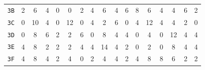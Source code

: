 \documentclass[12pt,a4paper]{article}
\begin{document}
\begin{center}
\begin{small}
\begin{longtable}{c|cccccccccccccccc}
\texttt{3B} & 2 & 6 & 4 & 0 & 0 & 2 & 4 & 6 & 4 & 6 & 8 & 6 & 4 & 4 & 6 & 2 \\
\texttt{3C} & 0 & 10 & 4 & 0 & 12 & 0 & 4 & 2 & 6 & 0 & 4 & 12 & 4 & 4 & 2 & 0 \\
\texttt{3D} & 0 & 8 & 6 & 2 & 2 & 6 & 0 & 8 & 4 & 4 & 0 & 4 & 0 & 12 & 4 & 4 \\
\texttt{3E} & 4 & 8 & 2 & 2 & 2 & 4 & 4 & 14 & 4 & 2 & 0 & 2 & 0 & 8 & 4 & 4 \\
\texttt{3F} & 4 & 8 & 4 & 2 & 4 & 0 & 2 & 4 & 4 & 2 & 4 & 8 & 8 & 6 & 2 & 2 \\ \bottomrule
\end{longtable}
\end{small}
\end{center}



\end{document}
